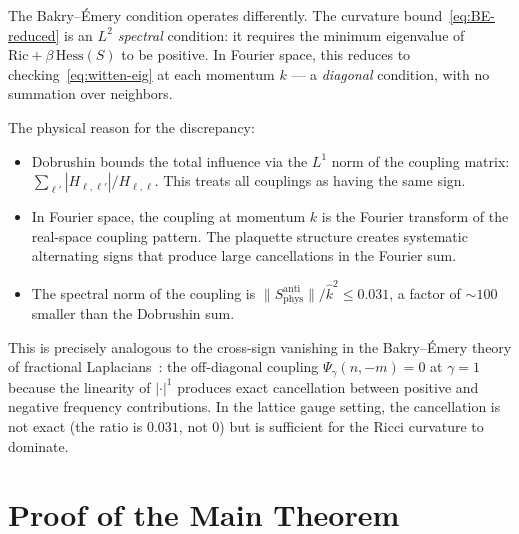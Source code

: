 \documentclass[11pt,a4paper]{article}
\theoremstyle{plain}
\theoremstyle{definition}
\theoremstyle{remark}
\newcommand{\Hess}{\mathrm{Hess}}
\newcommand{\Ric}{\mathrm{Ric}}
\newcommand{\khat}{\hat{k}}
\begin{document}
The Bakry--\'Emery condition operates differently.
The curvature bound~\eqref{eq:BE-reduced} is an
\emph{$L^2$ spectral} condition: it requires the minimum
eigenvalue of $\Ric + \beta\,\Hess(S)$ to be positive.
In Fourier space, this reduces to checking~\eqref{eq:witten-eig}
at each momentum $k$ --- a \emph{diagonal} condition, with
no summation over neighbors.

The physical reason for the discrepancy:
\begin{itemize}
\item Dobrushin bounds the total influence via the $L^1$ norm
  of the coupling matrix: $\sum_{\ell'} |H_{\ell,\ell'}| / H_{\ell,\ell}$.
  This treats all couplings as having the same sign.
\item In Fourier space, the coupling at momentum $k$ is the
  Fourier transform of the real-space coupling pattern.
  The plaquette structure creates systematic alternating signs
  that produce large cancellations in the Fourier sum.
\item The spectral norm of the coupling is
  $\|S^{\mathrm{anti}}_{\mathrm{phys}}\|/\khat^2 \leq 0.031$,
  a factor of $\sim 100$ smaller than the Dobrushin sum.
\end{itemize}

This is precisely analogous to the cross-sign vanishing
in the Bakry--\'Emery theory of fractional
Laplacians~\cite{Fontes2026b}: the off-diagonal coupling
$\Psi_\gamma(n, -m) = 0$ at $\gamma = 1$ because the
linearity of $|\cdot|^1$ produces exact cancellation
between positive and negative frequency contributions.
In the lattice gauge setting, the cancellation is not exact
(the ratio is $0.031$, not $0$) but is sufficient for the
Ricci curvature to dominate.


\section{Proof of the Main Theorem}\label{sec:proof}
\end{document}
